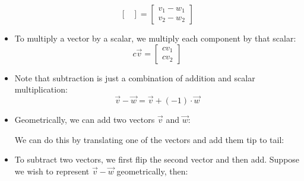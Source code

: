 \begin{itemize}
\begin{equation}
\begin{bmatrix}
        \end{bmatrix}=\begin{bmatrix}
            v_1-w_1 \\ v_2-w_2
        \end{bmatrix}
        \label{eq:}
    \end{equation}
    \item To multiply a vector by a scalar, we multiply each component by that scalar:
    \begin{equation}
        c\vec{v} = \begin{bmatrix}
            cv_1 \\ cv_2
        \end{bmatrix}
        \label{eq:}
    \end{equation}
    \item Note that subtraction is just a combination of addition and scalar multiplication:
    \begin{equation}
        \vec{v}-\vec{w}=\vec{v}+(-1)\cdot\vec{w}
        \label{eq:}
    \end{equation}
    \item Geometrically, we can add two vectors $\vec{v}$ and $\vec{w}$:
    \begin{center}
    \end{center}
    We can do this by translating one of the vectors and add them tip to tail:
    \begin{center}
    \end{center}
    \item To subtract two vectors, we first flip the second vector and then add. Suppose we wish to represent $\vec{v}-\vec{w}$ geometrically, then:
    \begin{center}
\end{center}
\end{itemize}
